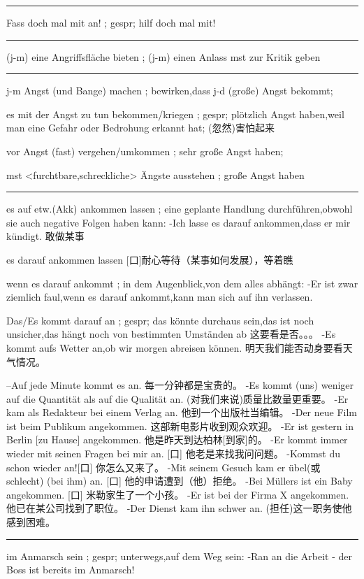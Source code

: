 \noindent\rule{\textwidth}{1pt}  
Fass doch mal mit an! ; gespr; hilf doch mal mit!

\noindent\rule{\textwidth}{1pt}  
(j-m) eine Angriffsfläche bieten ; (j-m) einen Anlass mst zur Kritik geben

\noindent\rule{\textwidth}{1pt}  
j-m Angst (und Bange) machen ; bewirken,dass j-d (große) Angst bekommt;

es mit der Angst zu tun bekommen/kriegen ; gespr; plötzlich Angst haben,weil man eine Gefahr oder Bedrohung erkannt hat;
(忽然)害怕起来

vor Angst (fast) vergehen/umkommen ; sehr große Angst haben; 

mst <furchtbare,schreckliche> Ängste ausstehen ; große Angst haben

\noindent\rule{\textwidth}{1pt}  
es auf etw.(Akk) ankommen lassen ; eine geplante Handlung durchführen,obwohl sie auch negative Folgen haben kann:
-Ich lasse es darauf ankommen,dass er mir kündigt.
敢做某事

es darauf ankommen lassen
[口]耐心等待（某事如何发展），等着瞧

wenn es darauf ankommt ; in dem Augenblick,von dem alles abhängt: 
-Er ist zwar ziemlich faul,wenn es darauf ankommt,kann man sich auf ihn verlassen.

Das/Es kommt darauf an ; gespr; das könnte durchaus sein,das ist noch unsicher,das hängt noch von bestimmten Umständen ab
这要看是否。。。
-Es kommt aufs Wetter an,ob wir morgen abreisen können. 明天我们能否动身要看天气情况。

--Auf jede Minute kommt es an. 每一分钟都是宝贵的。
-Es kommt (uns) weniger auf die Quantität als auf die Qualität an. (对我们来说)质量比数量更重要。
-Er kam als Redakteur bei einem Verlag an. 他到一个出版社当编辑。
-Der neue Film ist beim Publikum angekommen. 这部新电影片收到观众欢迎。
-Er ist gestern in Berlin [zu Hause] angekommen. 他是昨天到达柏林[到家]的。
-Er kommt immer wieder mit seinen Fragen bei mir an. [口] 他老是来找我问问题。
-Kommst du schon wieder an![口] 你怎么又来了。
-Mit seinem Gesuch kam er übel(或 schlecht) (bei ihm) an. [口] 他的申请遭到（他）拒绝。
-Bei Müllers ist ein Baby angekommen. [口] 米勒家生了一个小孩。
-Er ist bei der Firma X angekommen. 他已在某公司找到了职位。
-Der Dienst kam ihn schwer an. (担任)这一职务使他感到困难。

\noindent\rule{\textwidth}{1pt}  
im Anmarsch sein ; gespr; unterwegs,auf dem Weg sein: -Ran an die Arbeit - der Boss ist bereits im Anmarsch!

